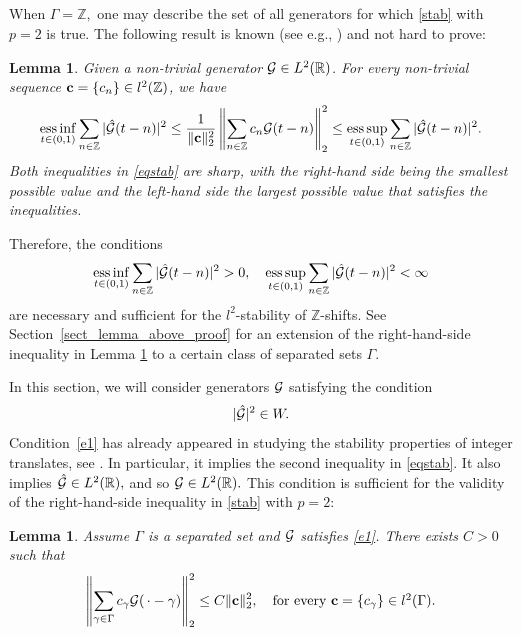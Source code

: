 \documentclass[12pt]{amsart}
\numberwithin{equation}{section}
\newtheorem{lemma}[theorem]{Lemma}
\newcommand{\R}{{\mathbb R}} \newcommand{\Q}{{\mathbb Q}} \newcommand{\Z}{{\mathbb Z}} \newcommand{\N}{{\mathbb N}}
\DeclareMathOperator*{\essi}{ess\,inf}
\DeclareMathOperator*{\ess}{ess\,sup}
\begin{document}
\subsection{}
 When $\Gamma=\Z,$ one may describe the set of all generators for which 
\eqref{stab}  with $p=2$ is true. The following result is known (see e.g., \cite[Theorem~10.19]{MR2744776}) and not hard to prove: 

\begin{lemma}\label{Integer_rhs_cond} Given a non-trivial generator $\Ff\in L^2(\R)$. For every non-trivial sequence ${\bf c}=\{c_n\}\in l^2(\Z)$, we have 
$$  \essi_{t\in(0,1)}\sum\limits_{n \in \Z} |\hat{\Ff} (t -n)|^2\leq \frac{1}{\|{\bf c}\|_2^2 }\left\|\sum_{n\in\Z}c_n \Ff(t-n)\right\|_2^2\leq \ess_{t\in(0,1)} \sum\limits_{n \in \Z} |\hat{\Ff} (t -n)|^2.$$Both inequalities in \eqref{eqstab} are sharp, with the right-hand side being the smallest possible value and the left-hand side the largest possible value that satisfies the inequalities.
\end{lemma}

Therefore, the conditions
\begin{equation}\label{eqstab}\essi_{t\in(0,1)} \sum\limits_{n \in \Z} |\hat{\Ff} (t -n)|^2>0,\quad  \ess_{t\in(0,1)} \sum\limits_{n \in \Z} |\hat{\Ff} (t -n)|^2<\infty\end{equation}are necessary and sufficient for the $l^2$-stability of $\Z$-shifts.
See Section~\ref{sect_lemma_above_proof} for an extension of the right-hand-side inequality in Lemma \ref{Integer_rhs_cond}  to a certain class of separated sets $\Gamma.$

In this section, we will consider generators $\mathcal{G}$ satisfying the condition 
\begin{equation}\label{e1}
    |\hat\Ff |^2\in W.
\end{equation}
 Condition~\eqref{e1} has already appeared in studying the stability properties of integer translates, see \cite[Lemma~10.24]{MR2744776}.
In particular, it implies the second  inequality in \eqref{eqstab}. It also implies $\hat\Ff\in L^2(\R), $ and so $\Ff\in L^2(\R).$ This condition is sufficient for the validity of the right-hand-side inequality in \eqref{stab}  with $p=2$:

\begin{lemma}\label{lemma_above_est}
       Assume $\Gamma$ is a separated set and $\mathcal{G}$ satisfies \eqref{e1}. There exists $C>0$ such that
        \begin{equation}\label{l2stab_above}
            \left\|\sum_{\gamma \in \Gamma} c_{\gamma} \Ff(\,\cdot - \gamma) \right\|^2_2 \le C \|\cc\|_2^2,\quad \mbox{for every $\cc=\{c_\gamma\} \in l^2(\Gamma).$}
        \end{equation}
\end{lemma}
\end{document}
